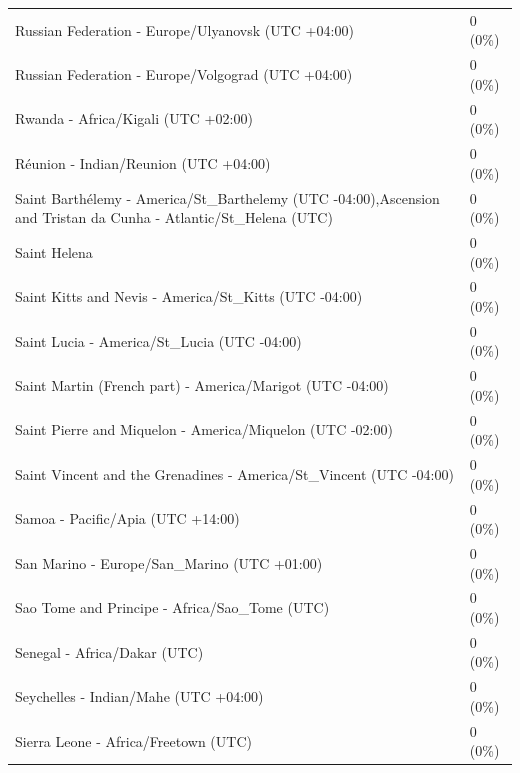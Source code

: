 \begin{appendix}
\begin{table}
{\begin{tabular}[t]{ll}
\addlinespace
\hspace{1em}Russian Federation - Europe/Ulyanovsk (UTC +04:00) & 0 (0\%)\\
\hspace{1em}Russian Federation - Europe/Volgograd (UTC +04:00) & 0 (0\%)\\
\hspace{1em}Rwanda - Africa/Kigali (UTC +02:00) & 0 (0\%)\\
\hspace{1em}Réunion - Indian/Reunion (UTC +04:00) & 0 (0\%)\\
\hspace{1em}Saint Barthélemy - America/St\_Barthelemy (UTC -04:00),Ascension and Tristan da Cunha - Atlantic/St\_Helena (UTC) & 0 (0\%)\\
\addlinespace
\hspace{1em}Saint Helena & 0 (0\%)\\
\hspace{1em}Saint Kitts and Nevis - America/St\_Kitts (UTC -04:00) & 0 (0\%)\\
\hspace{1em}Saint Lucia - America/St\_Lucia (UTC -04:00) & 0 (0\%)\\
\hspace{1em}Saint Martin (French part) - America/Marigot (UTC -04:00) & 0 (0\%)\\
\hspace{1em}Saint Pierre and Miquelon - America/Miquelon (UTC -02:00) & 0 (0\%)\\
\addlinespace
\hspace{1em}Saint Vincent and the Grenadines - America/St\_Vincent (UTC -04:00) & 0 (0\%)\\
\hspace{1em}Samoa - Pacific/Apia (UTC +14:00) & 0 (0\%)\\
\hspace{1em}San Marino - Europe/San\_Marino (UTC +01:00) & 0 (0\%)\\
\hspace{1em}Sao Tome and Principe - Africa/Sao\_Tome (UTC) & 0 (0\%)\\
\hspace{1em}Senegal - Africa/Dakar (UTC) & 0 (0\%)\\
\addlinespace
\hspace{1em}Seychelles - Indian/Mahe (UTC +04:00) & 0 (0\%)\\
\hspace{1em}Sierra Leone - Africa/Freetown (UTC) & 0 (0\%)\\

\end{tabular}}
\end{table}
\end{appendix}
